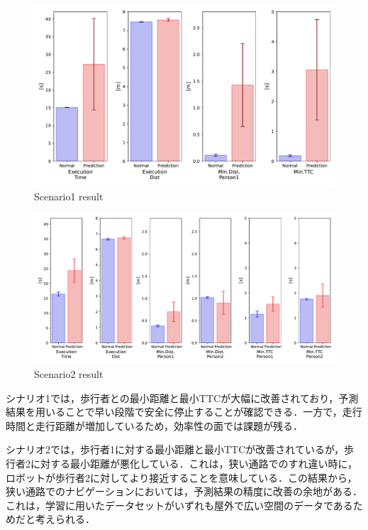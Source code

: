\begin{figure}[H]
  \centering
 \includegraphics[keepaspectratio, scale=0.53]
      {images/scenario1_result.pdf}
  \caption{Scenario1 result}
 \label{Fig:scenario1-result}
\end{figure} 

\begin{figure}[H]
  \centering
 \includegraphics[keepaspectratio, scale=0.44]
      {images/scenario2_result.pdf}
  \caption{Scenario2 result}
 \label{Fig:scenario2-result}
\end{figure} 

シナリオ1では，歩行者との最小距離と最小TTCが大幅に改善されており，予測結果を用いることで早い段階で安全に停止することが確認できる．一方で，走行時間と走行距離が増加しているため，効率性の面では課題が残る．

シナリオ2では，歩行者1に対する最小距離と最小TTCが改善されているが，歩行者2に対する最小距離が悪化している．これは，狭い通路でのすれ違い時に，ロボットが歩行者2に対してより接近することを意味している．この結果から，狭い通路でのナビゲーションにおいては，予測結果の精度に改善の余地がある．これは，学習に用いたデータセットがいずれも屋外で広い空間のデータであるためだと考えられる．

